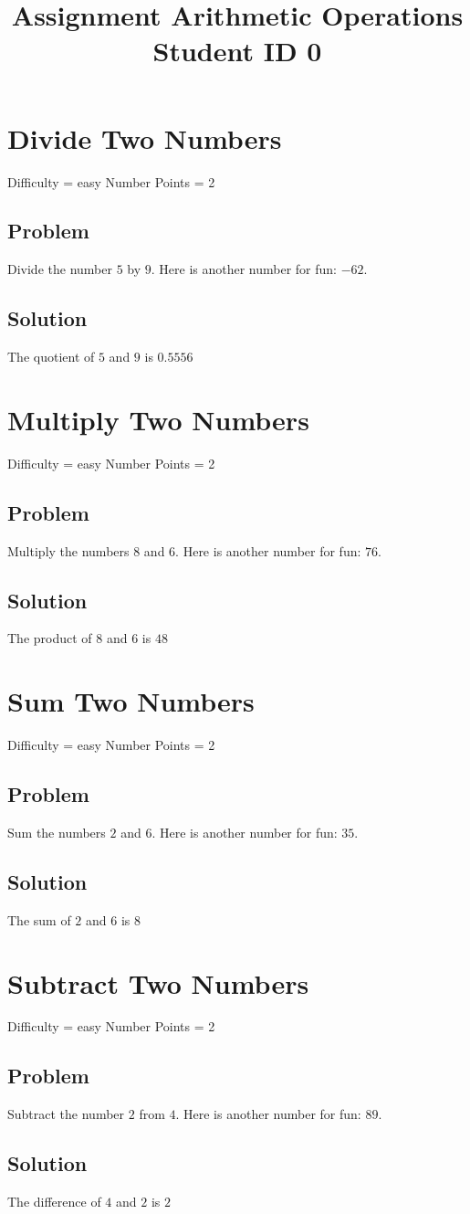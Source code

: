 \documentclass{article}
\title{Assignment Arithmetic Operations \\ Student ID 0}
\begin{document}
\maketitle

\section{Divide Two Numbers}
Difficulty = easy
Number Points = 2
\subsection{Problem}
Divide the number $5$ by $9$. Here is another number for fun: $-62$.
\subsection{Solution}
The quotient of $5$ and $9$ is $0.5556$
\section{Multiply Two Numbers}
Difficulty = easy
Number Points = 2
\subsection{Problem}
Multiply the numbers $8$ and $6$. Here is another number for fun: $76$.
\subsection{Solution}
The product of $8$ and $6$ is $48$
\section{Sum Two Numbers}
Difficulty = easy
Number Points = 2
\subsection{Problem}
Sum the numbers $2$ and $6$. Here is another number for fun: $35$.
\subsection{Solution}
The sum of $2$ and $6$ is $8$
\section{Subtract Two Numbers}
Difficulty = easy
Number Points = 2
\subsection{Problem}
Subtract the number $2$ from $4$. Here is another number for fun: $89$.
\subsection{Solution}
The difference of $4$ and $2$ is $2$
\end{document}
